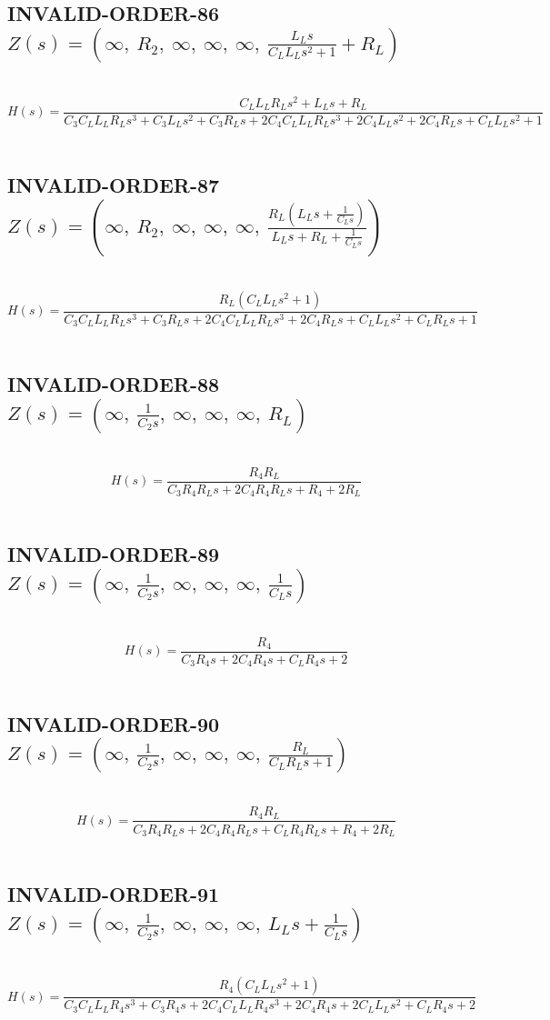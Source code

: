 \documentclass{article}
\begin{document}
\subsection{INVALID-ORDER-86 $Z(s) = \left( \infty, \  R_{2}, \  \infty, \  \infty, \  \infty, \  \frac{L_{L} s}{C_{L} L_{L} s^{2} + 1} + R_{L}\right)$ } \ 
\textbf{\[H(s) = \frac{C_{L} L_{L} R_{L} s^{2} + L_{L} s + R_{L}}{C_{3} C_{L} L_{L} R_{L} s^{3} + C_{3} L_{L} s^{2} + C_{3} R_{L} s + 2 C_{4} C_{L} L_{L} R_{L} s^{3} + 2 C_{4} L_{L} s^{2} + 2 C_{4} R_{L} s + C_{L} L_{L} s^{2} + 1}\] } \ 
\subsection{INVALID-ORDER-87 $Z(s) = \left( \infty, \  R_{2}, \  \infty, \  \infty, \  \infty, \  \frac{R_{L} \left(L_{L} s + \frac{1}{C_{L} s}\right)}{L_{L} s + R_{L} + \frac{1}{C_{L} s}}\right)$ } \ 
\textbf{\[H(s) = \frac{R_{L} \left(C_{L} L_{L} s^{2} + 1\right)}{C_{3} C_{L} L_{L} R_{L} s^{3} + C_{3} R_{L} s + 2 C_{4} C_{L} L_{L} R_{L} s^{3} + 2 C_{4} R_{L} s + C_{L} L_{L} s^{2} + C_{L} R_{L} s + 1}\] } \ 
\subsection{INVALID-ORDER-88 $Z(s) = \left( \infty, \  \frac{1}{C_{2} s}, \  \infty, \  \infty, \  \infty, \  R_{L}\right)$ } \ 
\textbf{\[H(s) = \frac{R_{4} R_{L}}{C_{3} R_{4} R_{L} s + 2 C_{4} R_{4} R_{L} s + R_{4} + 2 R_{L}}\] } \ 
\subsection{INVALID-ORDER-89 $Z(s) = \left( \infty, \  \frac{1}{C_{2} s}, \  \infty, \  \infty, \  \infty, \  \frac{1}{C_{L} s}\right)$ } \ 
\textbf{\[H(s) = \frac{R_{4}}{C_{3} R_{4} s + 2 C_{4} R_{4} s + C_{L} R_{4} s + 2}\] } \ 
\subsection{INVALID-ORDER-90 $Z(s) = \left( \infty, \  \frac{1}{C_{2} s}, \  \infty, \  \infty, \  \infty, \  \frac{R_{L}}{C_{L} R_{L} s + 1}\right)$ } \ 
\textbf{\[H(s) = \frac{R_{4} R_{L}}{C_{3} R_{4} R_{L} s + 2 C_{4} R_{4} R_{L} s + C_{L} R_{4} R_{L} s + R_{4} + 2 R_{L}}\] } \ 
\subsection{INVALID-ORDER-91 $Z(s) = \left( \infty, \  \frac{1}{C_{2} s}, \  \infty, \  \infty, \  \infty, \  L_{L} s + \frac{1}{C_{L} s}\right)$ } \ 
\textbf{\[H(s) = \frac{R_{4} \left(C_{L} L_{L} s^{2} + 1\right)}{C_{3} C_{L} L_{L} R_{4} s^{3} + C_{3} R_{4} s + 2 C_{4} C_{L} L_{L} R_{4} s^{3} + 2 C_{4} R_{4} s + 2 C_{L} L_{L} s^{2} + C_{L} R_{4} s + 2}\] } \ 
\end{document}
